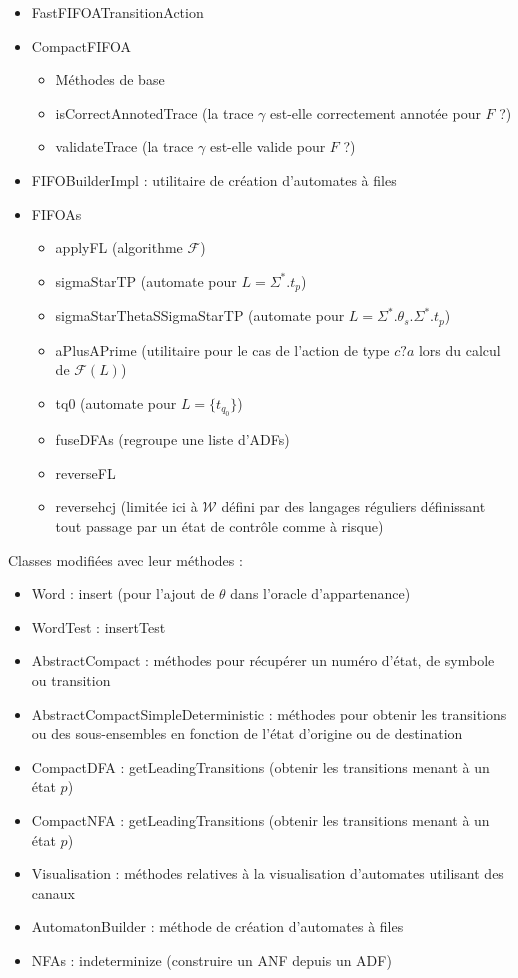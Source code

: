 \begin{itemize}
  \item FastFIFOATransitionAction
  \item CompactFIFOA
    \begin{itemize}
      \item Méthodes de base
      \item isCorrectAnnotedTrace (la trace $\gamma$ est-elle correctement annotée pour $F$ ?)
      \item validateTrace (la trace $\gamma$ est-elle valide pour $F$ ?)
    \end{itemize}
  \item FIFOBuilderImpl : utilitaire de création d'automates à files
  \item FIFOAs
    \begin{itemize}
      \item applyFL (algorithme $\mathcal{F}$)
      \item sigmaStarTP (automate pour $L=\Sigma^*.t_p$)
      \item sigmaStarThetaSSigmaStarTP (automate pour $L=\Sigma^*.\theta_s.\Sigma^*.t_p$)
      \item aPlusAPrime (utilitaire pour le cas de l'action de type $c?a$ lors du calcul de $\mathcal{F}(L)$)
      \item tq0 (automate pour $L=\{t_{q_0}\}$)
      \item fuseDFAs (regroupe une liste d'ADFs)
      \item reverseFL
      \item reversehcj (limitée ici à $\mathcal{W}$ défini par des langages réguliers définissant tout passage par un état de contrôle comme à risque)
    \end{itemize}
\end{itemize}

Classes modifiées avec leur méthodes :
\begin{itemize}
  \item Word : insert (pour l'ajout de $\theta$ dans l'oracle d'appartenance)
  \item WordTest : insertTest
  \item AbstractCompact : méthodes pour récupérer un numéro d'état, de symbole ou transition
  \item AbstractCompactSimpleDeterministic : méthodes pour obtenir les transitions ou des sous-ensembles en fonction de l'état d'origine ou de destination
  \item CompactDFA : getLeadingTransitions (obtenir les transitions menant à un état $p$)
  \item CompactNFA : getLeadingTransitions (obtenir les transitions menant à un état $p$)
  \item Visualisation : méthodes relatives à la visualisation d'automates utilisant des canaux
  \item AutomatonBuilder : méthode de création d'automates à files
  \item NFAs : indeterminize (construire un ANF depuis un ADF)
\end{itemize}

